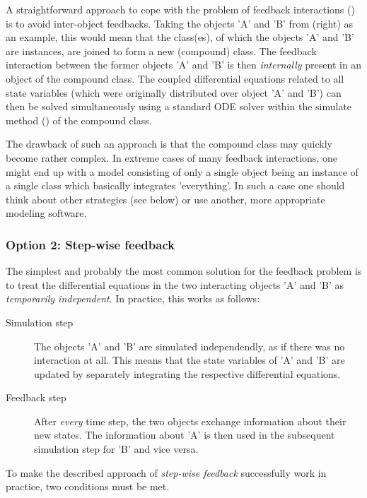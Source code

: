 A straightforward approach to cope with the problem of feedback interactions () is to avoid inter-object feedbacks. Taking the objects 'A' and 'B' from  (right) as an example, this would mean that the class(es), of which the objects 'A' and 'B' are instances, are joined to form a new (compound) class. The feedback interaction between the former objects 'A' and 'B' is then \emph{internally} present in an object of the compound class. The coupled differential equations related to all state variables (which were originally distributed over object 'A' and 'B') can then be solved simultaneously using a standard ODE solver within the simulate method () of the compound class.

The drawback of such an approach is that the compound class may quickly become rather complex. In extreme cases of many feedback interactions, one might end up with a model consisting of only a single object being an instance of a single class which basically integrates 'everything'. In such a case one should think about other strategies (see below) or use another, more appropriate modeling software.

\subsubsection*{Option 2: Step-wise feedback}

The simplest and probably the most common solution for the feedback problem is to treat the differential equations in the two interacting objects 'A' and 'B' as \emph{temporarily independent}. In practice, this works as follows:
\begin{description}
  \item [Simulation step] The objects 'A' and 'B' are simulated independendly, as if there was no interaction at all. This means that the state variables of 'A' and 'B' are updated by separately integrating the respective differential equations.
  \item [Feedback step] After \emph{every} time step, the two objects exchange information about their new states. The information about 'A' is then used in the subsequent simulation step for 'B' and vice versa.
\end{description}

To make the described approach of \emph{step-wise feedback} successfully work in practice, two conditions must be met.

